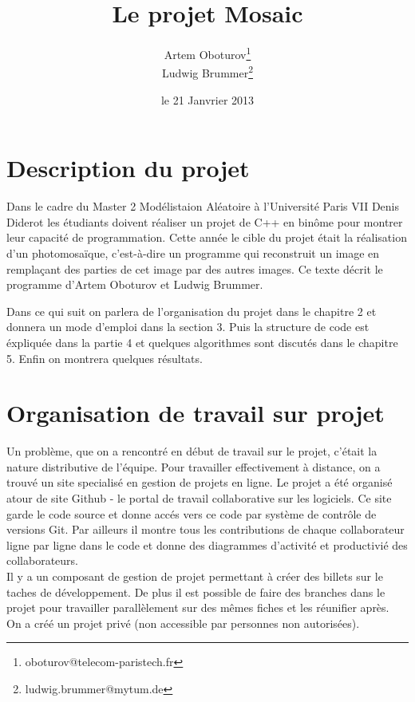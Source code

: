 \documentclass[a4paper]{article}
\begin{document}
\lstset{language=C++,tabsize=2, numbers=left}

\title{Le projet Mosaic}
\author{
  Artem Oboturov\thanks{oboturov@telecom-paristech.fr}
  \\Ludwig Brummer\thanks{ludwig.brummer@mytum.de}
}
\date{le 21 Janvrier 2013}
\maketitle
\section{Description du projet}
Dans le cadre du Master 2 Mod\'elistaion Al\'eatoire \`a l'Universit\'e Paris VII Denis Diderot les \'etudiants  doivent r\'ealiser un projet de C++ en bin\^ome pour montrer leur capacit\'e de programmation.
Cette ann\'ee le cible du projet \'etait la r\'ealisation d'un photomosa\"ique, c'est-\`a-dire un programme qui reconstruit un image en rempla\c{c}ant des parties de cet image par des autres images.
Ce texte d\'ecrit le programme d'Artem Oboturov et Ludwig Brummer.

Dans ce qui suit on parlera de l'organisation du projet dans le chapitre 2 et donnera un mode d'emploi  dans la section 3. Puis la structure de code est \'expliqu\'ee dans la partie 4 et quelques algorithmes sont discut\'es dans le chapitre 5.
Enfin on montrera quelques r\'esultats. 

\section{Organisation de travail sur projet}
Un probl\`eme, que on a rencontr\'e en d\'ebut de travail sur le projet, c'\'etait la nature distributive de l'\'equipe.
Pour travailler effectivement \`a distance, on a trouv\'e un site specialis\'e en gestion de projets en ligne.
Le projet a \'et\'e organis\'e atour de site Github - le portal de travail collaborative sur les logiciels.
Ce site garde le code source et donne acc\'es vers ce code par syst\`eme de contr\^ole de versions Git. Par ailleurs il montre tous les contributions de chaque collaborateur ligne par ligne dans le code et donne des diagrammes d'activit\'e et productivi\'e des collaborateurs.\\
Il y a un composant de gestion de projet permettant \`a cr\'eer des billets sur le taches de d\'eveloppement.
De plus il est possible de faire des branches dans le projet pour travailler parallèlement sur des m\^emes fiches et les r\'eunifier apr\`es.\\
On a cr\'e\'e un projet priv\'e (non accessible par personnes non autoris\'ees).
\end{document}
